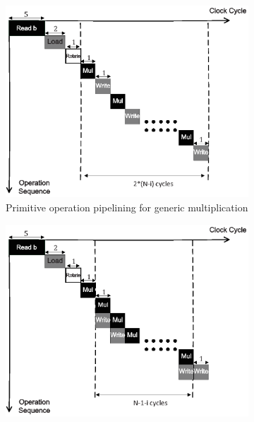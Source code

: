 \documentclass[runningheads]{llncs}
\begin{document}



\begin{figure}[!tb]
\centering
\begin{subfigure}[t]{0.47\textwidth}\centering
\includegraphics[width=\textwidth]{./fig/pipeline_dsnmul.eps}
\caption{Primitive operation pipelining for generic multiplication}
\label{fig:pipeline_gmul}
\end{subfigure}
\hspace{1em}
\begin{subfigure}[t]{0.47\textwidth}\centering
\includegraphics[width=\textwidth]{./fig/pipeline_dsnmul2.eps}

\end{subfigure}
\end{figure}
\end{document}
